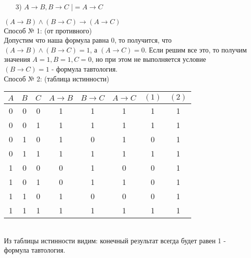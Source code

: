 \documentclass{article}
\begin{document}
\begin{enumerate}
\item[3)] $A \rightarrow B, B \rightarrow C$ |$= A \rightarrow C$
\end{enumerate}
$(A \rightarrow B) \wedge
(B \rightarrow C) \rightarrow (A \rightarrow C)$\\
Способ № 1: (от противного)\\
Допустим что наша формула равна 0, то получится, что $(A \rightarrow B) \wedge (B \rightarrow C) = 1$, а $(A \rightarrow C) = 0$. Если решим все это, то получим значения $A = 1, B = 1, C = 0$, но при этом не выполняется условие $(B \rightarrow C) = 1$ - формула тавтология.\\
Способ № 2: (таблица истинности)\\
\begin{tabular}{ | c | c | c | c | c | c | c| c | } %
$A$ & $B$ & $C$ & $A \rightarrow B$ & $B \rightarrow C$ & $A \rightarrow C$ & $(1)$ & $(2)$\\ \hline
0 & 0 & 0 & 1 & 1 & 1 & 1 & 1\\
0 & 0 & 1 & 1 & 1 & 1 & 1 & 1\\
0 & 1 & 0 & 1 & 0 & 1 & 0 & 1\\
0 & 1 & 1 & 1 & 1 & 1 & 1 & 1\\
1 & 0 & 0 & 0 & 1 & 0 & 0 & 1\\
1 & 0 & 1 & 0 & 1 & 1 & 0 & 1\\
1 & 1 & 0 & 1 & 0 & 0 & 0 & 1\\
1 & 1 & 1 & 1 & 1 & 1 & 1 & 1\\
\hline
\end{tabular} \\
Из таблицы истинности видим: конечный результат всегда будет равен 1 - формула тавтология.
\end{document}
